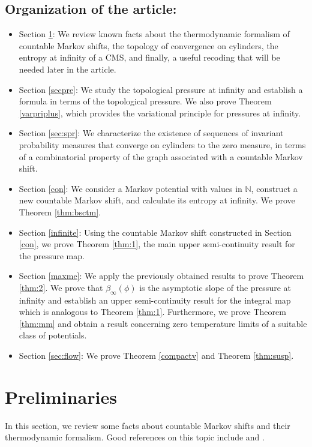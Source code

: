 \documentclass[letterpaper,11pt]{amsart}
\theoremstyle{plain}
\theoremstyle{plain}
\theoremstyle{definition}
\theoremstyle{remark}
\def\N{{\mathbb N}}
\begin{document}
\subsection{Organization of the article:} 
\begin{itemize}
\item Section \ref{preli}: We review known facts about the thermodynamic formalism of countable Markov shifts, the topology of convergence on cylinders, the entropy at infinity of a CMS, and finally, a useful recoding that will be needed later in the article. 
\item Section \ref{secpre}: We study the topological pressure at infinity and establish a formula in terms of the topological pressure. We also prove Theorem \ref{varpriplus}, which provides the variational principle for pressures at infinity.
\item Section \ref{sec:spr}: We characterize the existence of sequences of invariant probability measures that converge on cylinders to the zero measure, in terms of a combinatorial property of the graph associated with a countable Markov shift.
\item Section \ref{con}: We consider a Markov potential with values in $\N$, construct a new countable Markov shift, and calculate its entropy at infinity. We prove Theorem \ref{thm:bsctm}.
\item Section \ref{infinite}: Using the countable Markov shift constructed in Section \ref{con}, we prove Theorem \ref{thm:1}, the main upper semi-continuity result for the pressure map. 
\item Section \ref{maxme}: We apply the previously obtained results to prove Theorem \ref{thm:2}. We prove that $\beta_\infty(\phi)$ is the asymptotic slope of the pressure at infinity and establish an upper semi-continuity result for the integral map which is analogous to Theorem  \ref{thm:1}. Furthermore, we prove Theorem \ref{thm:mm} and obtain a  result concerning zero temperature limits of a suitable class of potentials.
\item Section \ref{sec:flow}: We prove Theorem \ref{compactv} and Theorem \ref{thm:susp}.
\end{itemize}








\section{Preliminaries}\label{preli}
In this section, we review some facts about countable Markov shifts and their thermodynamic formalism. Good references on this topic include \cite{sarigbook} and \cite[Section 2]{mu}.
\end{document}
